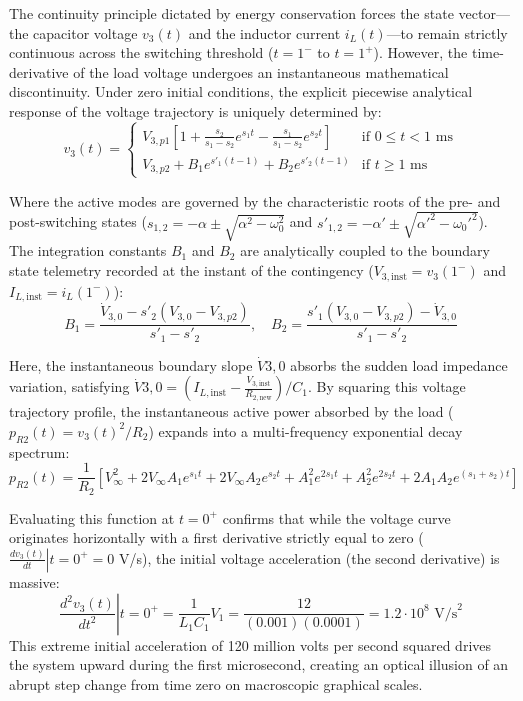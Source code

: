 \documentclass[energies,accept,oneauthor,pdftex]{Definitions/mdpi}
\begin{document}
The continuity principle dictated by energy conservation forces the state vector---the capacitor voltage $v_3(t)$ and the inductor current $i_L(t)$---to remain strictly continuous across the switching threshold ($t = 1^-$ to $t = 1^+$). However, the time-derivative of the load voltage undergoes an instantaneous mathematical discontinuity. Under zero initial conditions, the explicit piecewise analytical response of the voltage trajectory is uniquely determined by:
\begin{equation}
    v_3(t) = \begin{cases}
      V_{3,p1} \left[1+\frac{s_2}{s_1-s_2} e^{s_1t} -  \frac{s_1}{s_1-s_2} e^{s_2t}\right] & \text{if } 0 \le t < 1 \text{ ms}  \\
      V_{3,p2} + B_1e^{s'_1(t-1)} + B_2e^{s'_2(t-1)} & \text{if } t \ge 1 \text{ ms}
   \end{cases}
   \label{eq:piecewise_v3}
\end{equation}

Where the active modes are governed by the characteristic roots of the pre- and post-switching states ($s_{1,2} = -\alpha \pm \sqrt{\alpha^2 - \omega_0^2}$ and $s'_{1,2} = -\alpha' \pm \sqrt{\alpha'^2 - \omega_0'^2}$). The integration constants $B_1$ and $B_2$ are analytically coupled to the boundary state telemetry recorded at the instant of the contingency ($V_{3,\text{inst}} = v_3(1^-)$ and $I_{L,\text{inst}} = i_L(1^-)$):
\begin{equation}
    B_1 = \frac{\dot{V}_{3,0} - s'_2(V_{3,0} - V_{3,p2})}{s'_1 - s'_2}, \quad B_2 = \frac{s'_1(V_{3,0} - V_{3,p2}) - \dot{V}_{3,0}}{s'_1 - s'_2}
\end{equation}

Here, the instantaneous boundary slope $\dot{V}{3,0}$ absorbs the sudden load impedance variation, satisfying $\dot{V}{3,0} = (I_{L,\text{inst}} - \frac{V_{3,\text{inst}}}{R_{2,\text{new}}}) / C_1$.
By squaring this voltage trajectory profile, the instantaneous active power absorbed by the load ($p_{R2}(t) = v_3(t)^2 / R_2$) expands into a multi-frequency exponential decay spectrum:
\begin{equation}
p_{R2}(t) = \frac{1}{R_2}\left[ V_{\infty}^2 + 2V_{\infty} A_1 e^{s_1 t} + 2V_{\infty} A_2 e^{s_2 t} + A^2_{1} e^{2s_1 t} + A^2_{2} e^{2s_2 t} + 2A_1 A_{2}e^{(s_1+s_2) t}\right]
\end{equation}


Evaluating this function at $t = 0^+$ confirms that while the voltage curve originates horizontally with a first derivative strictly equal to zero ($\left.\frac{dv_3(t)}{dt}\right|{t=0^+} = 0$ V/s), the initial voltage acceleration (the second derivative) is massive:
\begin{equation}
\left.\frac{d^2v_3(t)}{dt^2}\right|{t=0^+} = \frac{1}{L_1C_1} V_1 = \frac{12}{(0.001) (0.0001)} = 1.2 \cdot 10^8 \text{ V/s}^2
\end{equation}
This extreme initial acceleration of 120 million volts per second squared drives the system upward during the first microsecond, creating an optical illusion of an abrupt step change from time zero on macroscopic graphical scales.
\end{document}

